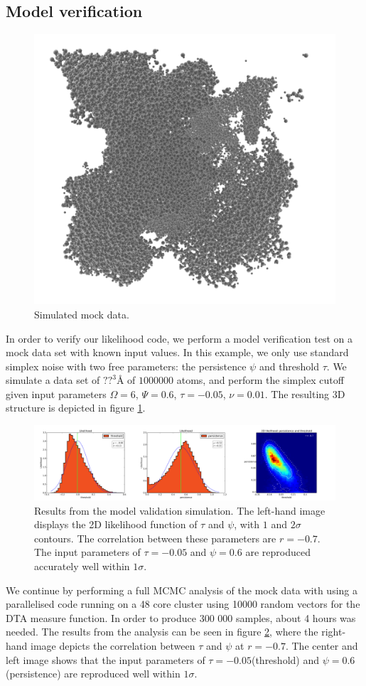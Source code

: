 \documentclass[aps,pre,twocolumn,letterpaper,floatfix,showpacs]{revtex4}
\begin{document}
\subsection{Model verification}
\begin{figure}[htb!]
\includegraphics[width=.45\textwidth]{model_test.png}
\caption{Simulated mock data. }
\label{fig:mockdata}
\end{figure}
In order to verify our likelihood code, we perform a model verification test on a mock data set with known input values. In this example, we only use standard simplex noise with two free parameters: the persistence $\psi$ and threshold $\tau$. We simulate a data set of $?? ^3 Å$ of $1 000 000$ atoms, and perform the simplex cutoff given input parameters $\Omega=6$, $\Psi = 0.6$, $\tau=-0.05$, $\nu=0.01$. The resulting 3D structure is depicted in figure \ref{fig:mockdata}. 

\begin{figure}
\includegraphics[width=.99\textwidth]{mock_data_results.png}
\caption{Results from the model validation simulation. The left-hand image displays the 2D likelihood function of $\tau$ and $\psi$, with $1$ and $2\sigma$ contours. The correlation between these parameters are $r=-0.7$. The input parameters of $\tau=-0.05$ and $\psi=0.6$ are reproduced accurately well within $1\sigma$. }
\label{fig:mockdataresults}
\end{figure}

We continue by performing a full MCMC analysis of the mock data with using a parallelised code running on a 48 core cluster using 10000 random vectors for the DTA measure function. In order to produce 300 000 samples, about 4 hours was needed. The results from the analysis can be seen in figure \ref{fig:mockdataresults}, where the right-hand image depicts the correlation between $\tau$ and $\psi$ at $r=-0.7$. The center and left image shows that the input parameters of $\tau=-0.05$(threshold) and $\psi=0.6$(persistence) are reproduced well within $1 \sigma$.
\end{document}
